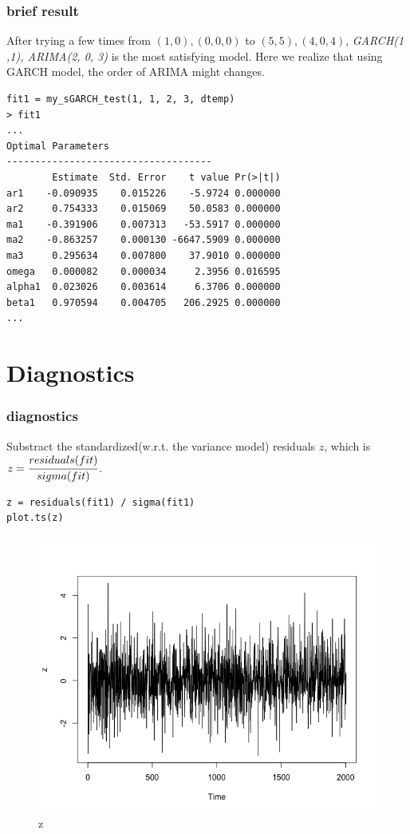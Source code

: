 \documentclass[9pt]{beamer}
\begin{document}
\begin{frame}[fragile]
\frametitle{brief result}
\indent After trying a few times from $(1, 0), (0, 0, 0)$ to $(5, 5), (4, 0, 4)$, \textit{GARCH(1 ,1), ARIMA(2, 0, 3)} is the most satisfying model. Here we realize that using GARCH model, the order of ARIMA might changes.

\begin{verbatim}
fit1 = my_sGARCH_test(1, 1, 2, 3, dtemp)
> fit1
...
Optimal Parameters
------------------------------------
        Estimate  Std. Error    t value Pr(>|t|)
ar1    -0.090935    0.015226    -5.9724 0.000000
ar2     0.754333    0.015069    50.0583 0.000000
ma1    -0.391906    0.007313   -53.5917 0.000000
ma2    -0.863257    0.000130 -6647.5909 0.000000
ma3     0.295634    0.007800    37.9010 0.000000
omega   0.000082    0.000034     2.3956 0.016595
alpha1  0.023026    0.003614     6.3706 0.000000
beta1   0.970594    0.004705   206.2925 0.000000
...
\end{verbatim}
\end{frame}

\section{Diagnostics}

\begin{frame}[fragile]
\frametitle{diagnostics}
\indent Substract the standardized(w.r.t. the variance model) residuals $z$, which is $z = \cfrac{residuals(fit)}{sigma(fit)}$.

\begin{verbatim}
z = residuals(fit1) / sigma(fit1)
plot.ts(z)
\end{verbatim}

\begin{figure}[H]
\centering
\caption{z}
\includegraphics[scale=.20]{z.png}
\end{figure}
\end{frame}
\end{document}
